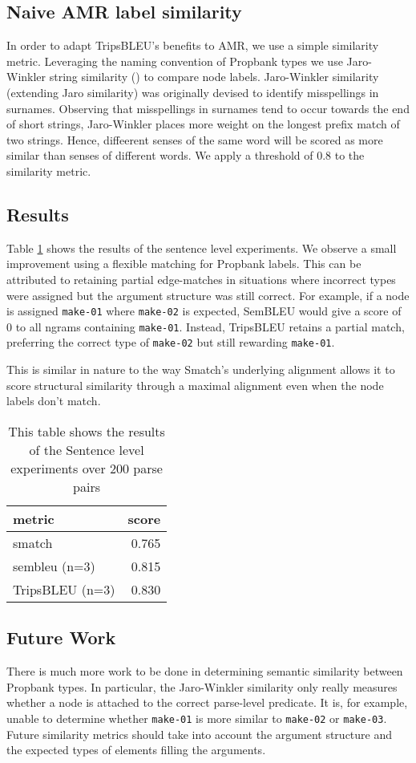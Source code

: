 \documentclass[11pt]{article}
\begin{document}
\subsection{Naive AMR label similarity}
\label{sec:orgffb3f05}
In order to adapt TripsBLEU's benefits to AMR, we use a simple similarity metric. Leveraging the naming convention of Propbank types
we use Jaro-Winkler string similarity (\cite{cohen2003comparison}) to compare node labels. Jaro-Winkler similarity (extending Jaro similarity) was originally devised to identify misspellings in surnames. Observing that misspellings in surnames tend to occur towards the end of short strings, Jaro-Winkler places more weight on the longest prefix match of two strings. Hence, diffeerent senses of the same word will be scored as more similar than senses of different words. We apply a threshold of 0.8 to the similarity metric.

\subsection{Results}
\label{sec:orgcff71cf}
Table \ref{table:sembleu-sentence} shows the results of the sentence level experiments. We observe a small improvement using a flexible matching for Propbank labels. This can be attributed to retaining partial edge-matches in situations where incorrect types were assigned but the argument structure was still correct. For example, if a node is assigned \texttt{make-01} where \texttt{make-02} is expected, SemBLEU would give a score of 0 to all ngrams containing \texttt{make-01}. Instead, TripsBLEU retains a partial match, preferring the correct type of \texttt{make-02} but still rewarding \texttt{make-01}.

This is similar in nature to the way Smatch's underlying alignment allows it to score structural similarity through a maximal alignment
even when the node labels don't match.

\begin{table}[htbp]
\centering
\begin{tabular}{lr}
\hline
metric & score\\
\hline
smatch & 0.765\\
sembleu (n=3) & 0.815\\
TripsBLEU (n=3) & 0.830\\
\hline
\end{tabular}
\caption{\label{table:sembleu-sentence}This table shows the results of the Sentence level experiments over 200 parse pairs}

\end{table}
\subsection{Future Work}
\label{sec:orga96c5a3}
There is much more work to be done in determining semantic similarity between Propbank types. In particular, the Jaro-Winkler similarity only really measures whether a node is attached to the correct parse-level predicate. It is, for example, unable to determine whether \texttt{make-01} is more similar to \texttt{make-02} or \texttt{make-03}. Future similarity metrics should take into account the argument structure and the expected types of elements filling the arguments.
\end{document}
